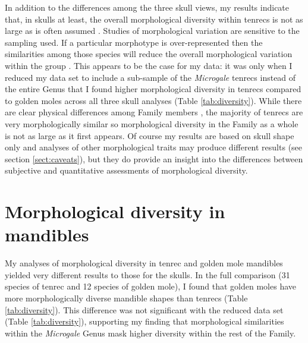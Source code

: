 	

	In addition to the differences among the three skull views, my results indicate that, in skulls at least, the overall morphological diversity within tenrecs is not as large as is often assumed \citep[e.g.][]{Eisenberg1969, Olson2013}. Studies of morphological variation are sensitive to the sampling used. If a particular morphotype is over-represented then the similarities among those species will reduce the overall morphological variation within the group \citep{Foote1991}. This appears to be the case for my data: it was only when I reduced my data set to include a sub-sample of the \textit{Microgale} tenrecs instead of the entire Genus that I found higher morphological diversity in tenrecs compared to golden moles across all three skull analyses (Table \ref{tab:diversity}).
	While there are clear physical differences among Family members \citep{Olson2013, Eisenberg1969}, the majority of tenrecs are very morphologically similar \citep{Jenkins2003} so morphological diversity in the Family as a whole is not as large as it first appears. Of course my results are based on skull shape only and analyses of other morphological traits may produce different results (see section \ref{sect:caveats}), but they do provide an insight into the differences between subjective and quantitative assessments of morphological diversity.  

\section{Morphological diversity in mandibles}
	My analyses of morphological diversity in tenrec and golden mole mandibles yielded very different results to those for the skulls. In the full comparison (31 species of tenrec and 12 species of golden mole), I found that golden moles have more morphologically diverse mandible shapes than tenrecs (Table \ref{tab:diversity}). This difference was not significant with the reduced data set (Table \ref{tab:diversity}), supporting my finding that morphological similarities within the \textit{Microgale} Genus mask higher diversity within the rest of the Family.
	
